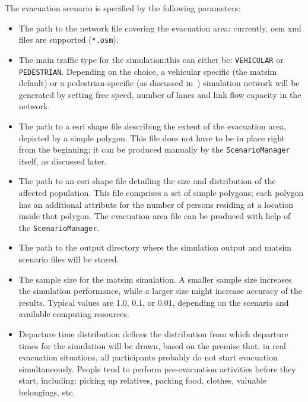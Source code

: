 The evacuation scenario is specified by the following parameters:
\begin{itemize}\styleItemize
\item The path to the network file covering the evacuation area: currently, \gls{osm} \gls{xml} files are supported (\lstinline|*.osm|).
\item The main traffic type for the simulation:this can either be: \lstinline|VEHICULAR| or \lstinline|PEDESTRIAN|. Depending on the choice, a vehicular specific (the \gls{matsim} default) or a pedestrian-specific (as discussed in~\citet{00LaemmelKluepfelNagel2009EvacPadangAtBookTimmermanns,Laemmel_PhDThesis_2011}) simulation network will be generated by setting free speed, number of lanes and link  flow capacity in the network.
\item The path to a \gls{esri} shape file describing the extent of the evacuation area, depicted by a simple polygon. This file does not have to be in place right from the beginning; it can be produced manually by the \lstinline|ScenarioManager| itself, as discussed later.
\item The path to an \gls{esri} shape file detailing the size and distribution of the affected population. This file comprises a set of simple polygons; each polygon has an additional attribute for the number of persons residing at a location inside that polygon. The evacuation area file can be produced with help of the \lstinline|ScenarioManager|.
\item The path to the output directory where the simulation output and \gls{matsim} scenario files will be stored.
\item The sample size for the \gls{matsim} simulation. A smaller sample size increases the simulation performance, while a larger size might increase accuracy of the results. Typical values are 1.0, 0.1, or 0.01, depending on the scenario and available computing resources.
\item Departure time distribution defines the distribution from which departure times for the simulation will be drawn, based on the premise that, in real evacuation situations, all participants probably do not start evacuation simultaneously. 
People tend to perform pre-evacuation activities before they start, including: picking up relatives, packing food, clothes, valuable belongings, etc. 

\end{itemize}
